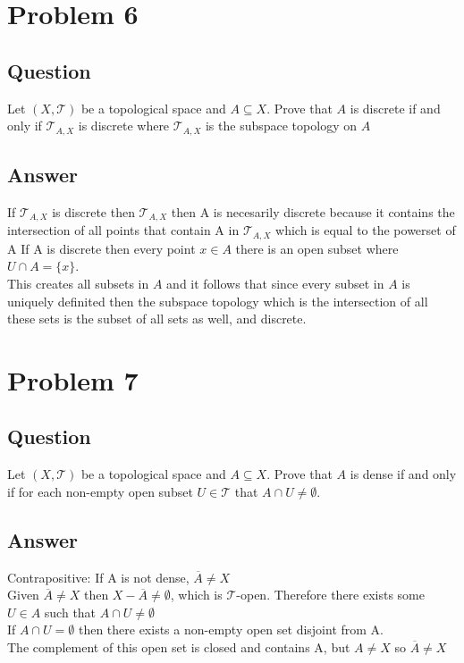 \documentclass{article}
\begin{document}
\section*{Problem 6}
\subsection*{Question}
Let \((X, \mathscr{T})\) be a topological space and \(A \subseteq X\). Prove that \(A\) is discrete if and only if \(\mathscr{T}_{A,X}\) is discrete where \(\mathscr{T}_{A,X}\) is the subspace topology on \(A\)
\subsection*{Answer}
If \(\mathscr{T}_{A,X}\) is discrete then \(\mathscr{T}_{A,X}\) then A is necesarily discrete because it contains the intersection of all points that contain A in \(\mathscr{T}_{A,X}\) which is equal to the powerset of A
If A is discrete then every point \(x \in A\) there is an open subset where \(U \cap A = \{x\}\).
\\ This creates all subsets in \(A\) and it follows that since every subset in \(A\) is uniquely definited then the subspace topology which is the intersection of all these sets is the subset of all sets as well, and discrete.
\section*{Problem 7}
\subsection*{Question}
Let \((X,\mathscr{T})\) be a topological space and \(A \subseteq X\). Prove that \(A\) is dense if and only if for each non-empty
open subset \(U \in \mathscr{T}\) that \(A \cap U \neq \emptyset\). 
\subsection*{Answer}
Contrapositive:
If A is not dense, \(\overline{A} \ne X\)
\\Given  \(\overline{A} \ne X\) then \(X - \overline{A} \ne \emptyset\), which is \(\mathscr{T}\)-open. Therefore there exists some \(U \in A\) such that \(A \cap U \ne \emptyset\)
\\If \(A \cap U = \emptyset\) then there exists a non-empty open set disjoint from A. 
\\The complement of this open set is closed and contains A, but \(A \ne X\) so \(\overline{A} \ne X\)
\end{document}
